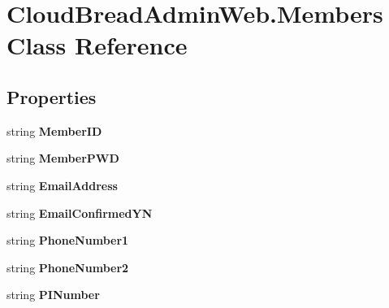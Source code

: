 \hypertarget{a00145}{}\section{Cloud\+Bread\+Admin\+Web.\+Members Class Reference}
\label{a00145}
\subsection*{Properties}
\begin{DoxyCompactItemize}
\item 
string {\bfseries Member\+ID}\hypertarget{a00145_a1ff6cf9453492e06f9b9d075b8030134}{}\label{a00145_a1ff6cf9453492e06f9b9d075b8030134}

\item 
string {\bfseries Member\+P\+WD}\hypertarget{a00145_aa121b33c7c2fce743dc112d1a67e2425}{}\label{a00145_aa121b33c7c2fce743dc112d1a67e2425}

\item 
string {\bfseries Email\+Address}\hypertarget{a00145_ad564f6dfced65aa59c7257e769508bf2}{}\label{a00145_ad564f6dfced65aa59c7257e769508bf2}

\item 
string {\bfseries Email\+Confirmed\+YN}\hypertarget{a00145_ae59291336e62f841e40ef2f1b843821b}{}\label{a00145_ae59291336e62f841e40ef2f1b843821b}

\item 
string {\bfseries Phone\+Number1}\hypertarget{a00145_a651e52f93801d9528eba1ed695b3d48c}{}\label{a00145_a651e52f93801d9528eba1ed695b3d48c}

\item 
string {\bfseries Phone\+Number2}\hypertarget{a00145_a918f402e46823f6c5bd07aff5110f49e}{}\label{a00145_a918f402e46823f6c5bd07aff5110f49e}

\item 
string {\bfseries P\+I\+Number}\hypertarget{a00145_a6ad071b1a742161165be95f1001ed8d6}{}\label{a00145_a6ad071b1a742161165be95f1001ed8d6}


\end{DoxyCompactItemize}
